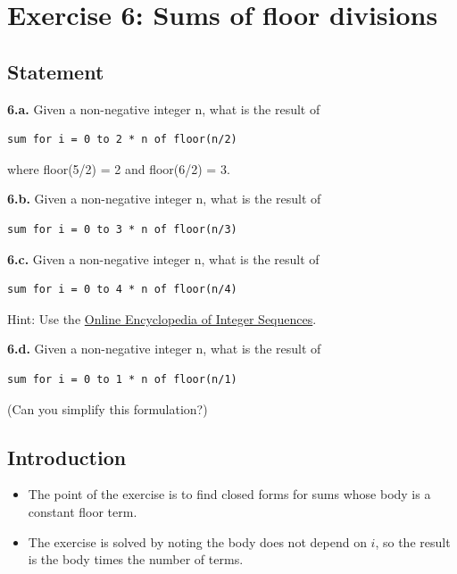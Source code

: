 \documentclass[12pt]{article}
\begin{document}

\newpage

\section{Exercise 6: Sums of floor divisions}


\subsection{Statement}

\textbf{6.a.} Given a non-negative integer n, what is the result of

\begin{verbatim}
sum for i = 0 to 2 * n of floor(n/2)
\end{verbatim}

where floor(5/2) = 2 and floor(6/2) = 3.

\textbf{6.b.} Given a non-negative integer n, what is the result of

\begin{verbatim}
sum for i = 0 to 3 * n of floor(n/3)
\end{verbatim}

\textbf{6.c.} Given a non-negative integer n, what is the result of

\begin{verbatim}
sum for i = 0 to 4 * n of floor(n/4)
\end{verbatim}

Hint: Use the
\href{https://oeis.org/}{Online Encyclopedia of Integer Sequences}.

\textbf{6.d.} Given a non-negative integer n, what is the result of

\begin{verbatim}
sum for i = 0 to 1 * n of floor(n/1)
\end{verbatim}

(Can you simplify this formulation?)


\subsection{Introduction}

\begin{itemize}

\item
  The point of the exercise is to find closed forms for sums whose body is a constant floor term.

\item
  The exercise is solved by noting the body does not depend on $i$, so the result is the body times the number of terms.

\end{itemize}
\end{document}
